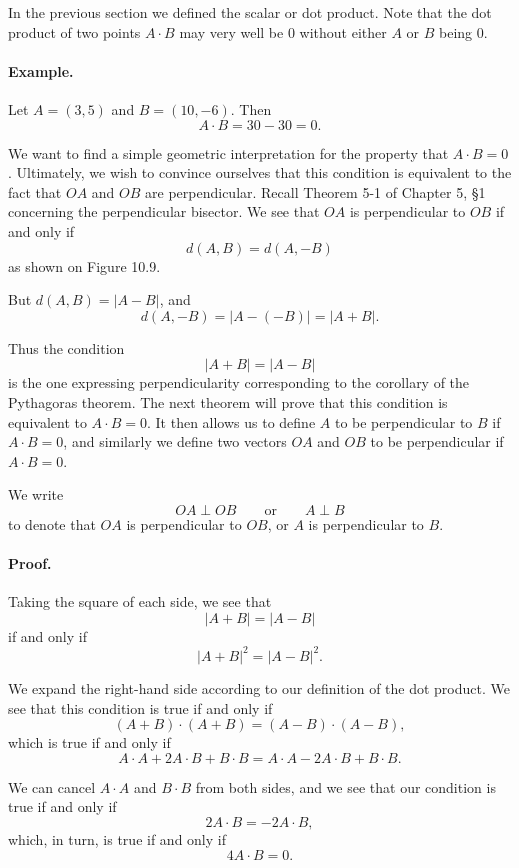 \documentclass[12pt]{book} %
\begin{document}
\begin{ExerciseList}
In the previous section we defined the scalar or dot product. Note that the dot product of two points $A\cdot B$ may very well be 0 without either $A$ or $B$ being 0.

\paragraph{Example.}
Let $A=(3,5)$ and $B=(10,-6)$. Then
\[
A\cdot B=30-30=0.
\]

We want to find a simple geometric interpretation for the property that $A\cdot B=0$. Ultimately, we wish to convince ourselves that this condition is equivalent to the fact that $OA$ and $OB$ are perpendicular. Recall Theorem 5-1 of Chapter 5, \S1 concerning the perpendicular bisector. We see that $OA$ is perpendicular to $OB$ if and only if
\[
d(A,B)=d(A,-B)
\]
as shown on Figure 10.9.


But $d(A,B)=|A-B|$, and
\[
d(A,-B)=|A-(-B)|=|A+B|.
\]

Thus the condition
\[
|A+B|=|A-B|
\]
is the one expressing perpendicularity corresponding to the corollary of the Pythagoras theorem. The next theorem will prove that this condition is equivalent to $A\cdot B=0$. It then allows us to define $A$ to be perpendicular to $B$ if $A\cdot B=0$, and similarly we define two vectors $OA$ and $OB$ to be perpendicular if $A\cdot B=0$.

We write
\[
OA\perp OB
\qquad \text{or} \qquad
A\perp B
\]
to denote that $OA$ is perpendicular to $OB$, or $A$ is perpendicular to $B$.


\paragraph{Proof.}
Taking the square of each side, we see that
\[
|A+B|=|A-B|
\]
if and only if
\[
|A+B|^2=|A-B|^2.
\]

We expand the right-hand side according to our definition of the dot product. We see that this condition is true if and only if
\[
(A+B)\cdot(A+B)=(A-B)\cdot(A-B),
\]
which is true if and only if
\[
A\cdot A+2A\cdot B+B\cdot B=A\cdot A-2A\cdot B+B\cdot B.
\]

We can cancel $A\cdot A$ and $B\cdot B$ from both sides, and we see that our condition is true if and only if
\[
2A\cdot B=-2A\cdot B,
\]
which, in turn, is true if and only if
\[
4A\cdot B=0.
\]


\end{ExerciseList}
\end{document}
